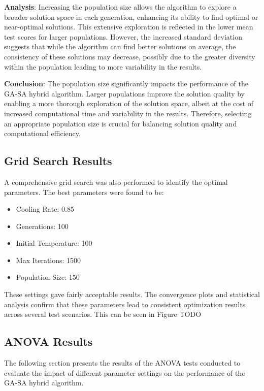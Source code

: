 \documentclass{article}
\begin{document}
    \textbf{Analysis}: Increasing the population size allows the algorithm to explore a broader solution space in each generation, enhancing its ability to find optimal or near-optimal solutions. This extensive exploration is reflected in the lower mean test scores for larger populations. However, the increased standard deviation suggests that while the algorithm can find better solutions on average, the consistency of these solutions may decrease, possibly due to the greater diversity within the population leading to more variability in the results.

    \textbf{Conclusion}: The population size significantly impacts the performance of the GA-SA hybrid algorithm. Larger populations improve the solution quality by enabling a more thorough exploration of the solution space, albeit at the cost of increased computational time and variability in the results. Therefore, selecting an appropriate population size is crucial for balancing solution quality and computational efficiency.

    \subsection{Grid Search Results}
    A comprehensive grid search was also performed to identify the optimal parameters.
    The best parameters were found to be:
    \begin{itemize}
        \item Cooling Rate: 0.85
        \item Generations: 100
        \item Initial Temperature: 100
        \item Max Iterations: 1500
        \item Population Size: 150
    \end{itemize}
    These settings gave fairly acceptable results. The convergence plots and statistical analysis confirm that these parameters lead to consistent optimization results across several test scenarios. This can be seen in Figure TODO

    \subsection{ANOVA Results}

    The following section presents the results of the ANOVA tests conducted to evaluate the impact of different parameter settings on the performance of the GA-SA hybrid algorithm.
\end{document}

